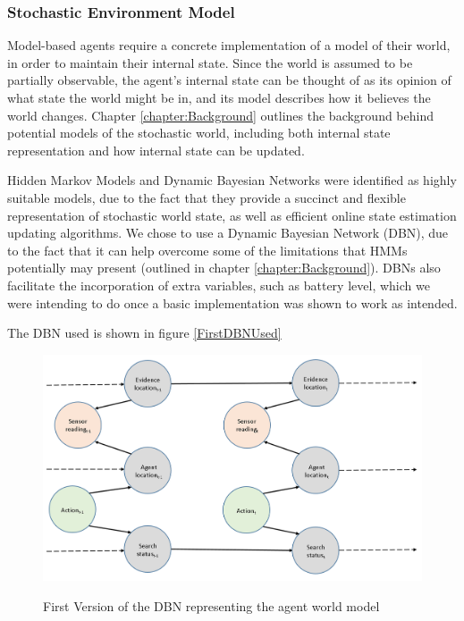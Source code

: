 \subsubsection{Stochastic Environment Model}
\workinprogress
Model-based agents require a concrete implementation of a model of their world, in order to maintain their internal state. Since the world is assumed to be partially observable, the agent's internal state can be thought of as its opinion of what state the world might be in, and its model describes how it believes the world changes. Chapter \ref{chapter:Background} outlines the background behind potential models of the stochastic world, including both internal state representation and how internal state can be updated.\par
Hidden Markov Models and Dynamic Bayesian Networks were identified as highly suitable models, due to the fact that they provide a succinct and flexible representation of stochastic world state, as well as efficient online state estimation updating algorithms. We chose to use a Dynamic Bayesian Network (DBN), due to the fact that it can help overcome some of the limitations that HMMs potentially may present (outlined in chapter \ref{chapter:Background}). DBNs also facilitate the incorporation of extra variables, such as battery level, which we were intending to do once a basic implementation was shown to work as intended.

The DBN used is shown in figure \ref{FirstDBNUsed}

\begin{figure}
    \centering
    \includegraphics[width = 0.8\linewidth]{Chapters/MultiAgentTargetDetection/Figs/DBNWithMultipleHiddenState.PNG}
    \label{fig:FirstDBNUsed}
    \caption{First Version of the DBN representing the agent world model}
    
\end{figure}




